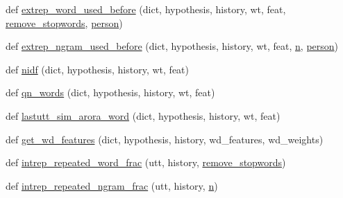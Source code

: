 \begin{DoxyCompactItemize}
\item 
def \hyperlink{namespaceprojects_1_1controllable__dialogue_1_1controllable__seq2seq_1_1controls_a1d20bea2946cab3a79aa8a2e77f9e09b}{extrep\+\_\+word\+\_\+used\+\_\+before} (dict, hypothesis, history, wt, feat, \hyperlink{namespaceprojects_1_1controllable__dialogue_1_1controllable__seq2seq_1_1controls_a16bf79fe7e9cbacf6cf5792aaaee4f88}{remove\+\_\+stopwords}, \hyperlink{namespaceprojects_1_1controllable__dialogue_1_1controllable__seq2seq_1_1controls_a852809286248c6b4113e7ca467f32eaf}{person})
\item 
def \hyperlink{namespaceprojects_1_1controllable__dialogue_1_1controllable__seq2seq_1_1controls_a5bc41cc6c701b5da46a74b17ead0e834}{extrep\+\_\+ngram\+\_\+used\+\_\+before} (dict, hypothesis, history, wt, feat, \hyperlink{namespaceprojects_1_1controllable__dialogue_1_1controllable__seq2seq_1_1controls_a8825ded618f6b3f758fdfc5c4a3bdc71}{n}, \hyperlink{namespaceprojects_1_1controllable__dialogue_1_1controllable__seq2seq_1_1controls_a852809286248c6b4113e7ca467f32eaf}{person})
\item 
def \hyperlink{namespaceprojects_1_1controllable__dialogue_1_1controllable__seq2seq_1_1controls_a27ef93e876c9c12b265bf2eefb65f058}{nidf} (dict, hypothesis, history, wt, feat)
\item 
def \hyperlink{namespaceprojects_1_1controllable__dialogue_1_1controllable__seq2seq_1_1controls_ac09ae7183b65c9bd1f6f1469db84012b}{qn\+\_\+words} (dict, hypothesis, history, wt, feat)
\item 
def \hyperlink{namespaceprojects_1_1controllable__dialogue_1_1controllable__seq2seq_1_1controls_afe0a10c32acfb1a7dd586ac644412589}{lastutt\+\_\+sim\+\_\+arora\+\_\+word} (dict, hypothesis, history, wt, feat)
\item 
def \hyperlink{namespaceprojects_1_1controllable__dialogue_1_1controllable__seq2seq_1_1controls_a0324491b8ecb07aaf415e47d6575cbac}{get\+\_\+wd\+\_\+features} (dict, hypothesis, history, wd\+\_\+features, wd\+\_\+weights)
\item 
def \hyperlink{namespaceprojects_1_1controllable__dialogue_1_1controllable__seq2seq_1_1controls_a6cac190e0676d3938ec8c2e5bd0c994d}{intrep\+\_\+repeated\+\_\+word\+\_\+frac} (utt, history, \hyperlink{namespaceprojects_1_1controllable__dialogue_1_1controllable__seq2seq_1_1controls_a16bf79fe7e9cbacf6cf5792aaaee4f88}{remove\+\_\+stopwords})
\item 
def \hyperlink{namespaceprojects_1_1controllable__dialogue_1_1controllable__seq2seq_1_1controls_afeb51a7c1798dbff5427d5ddec3d735c}{intrep\+\_\+repeated\+\_\+ngram\+\_\+frac} (utt, history, \hyperlink{namespaceprojects_1_1controllable__dialogue_1_1controllable__seq2seq_1_1controls_a8825ded618f6b3f758fdfc5c4a3bdc71}{n})

\end{DoxyCompactItemize}
